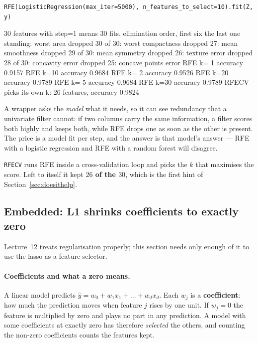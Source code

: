 \documentclass[11pt]{article}
\begin{document}
\begin{lstlisting}
RFE(LogisticRegression(max_iter=5000), n_features_to_select=10).fit(Z, y)
\end{lstlisting}
\begin{codeout}
30 features with step=1 means 30 fits.
elimination order, first six      the last one standing: worst area
   dropped 30 of 30: worst compactness      dropped 27: mean smoothness
   dropped 29 of 30: mean symmetry          dropped 26: texture error
   dropped 28 of 30: concavity error        dropped 25: concave points error
   RFE k= 1  accuracy 0.9157      RFE k=10  accuracy 0.9684
   RFE k= 2  accuracy 0.9526      RFE k=20  accuracy 0.9789
   RFE k= 5  accuracy 0.9684      RFE k=30  accuracy 0.9789
   RFECV picks its own k: 26 features, accuracy 0.9824
\end{codeout}

A wrapper asks the \emph{model} what it needs, so it can see redundancy that a
univariate filter cannot: if two columns carry the same information, a filter
scores both highly and keeps both, while RFE drops one as soon as the other is
present. The price is a model fit per step, and the answer is that model's
answer --- RFE with a logistic regression and RFE with a random forest will
disagree.

\texttt{RFECV} runs RFE inside a cross-validation loop and picks the $k$ that
maximises the score. Left to itself it kept \textbf{$26$ of the $30$}, which
is the first hint of Section~\ref{sec:doesithelp}.

\subsection{Embedded: L1 shrinks coefficients to exactly zero}
\label{sec:l1}

Lecture~12 treats regularisation properly; this section needs only enough of
it to use the lasso as a feature selector.

\paragraph{Coefficients and what a zero means.} A linear model predicts
$\hat y = w_0 + w_1 x_1 + \dots + w_d x_d$. Each $w_j$ is a
\textbf{coefficient}: how much the prediction moves when feature $j$ rises by
one unit. If $w_j = 0$ the feature is multiplied by zero and plays no part in
any prediction. A model with some coefficients at exactly zero has therefore
\emph{selected} the others, and counting the non-zero coefficients counts the
features kept.
\end{document}
